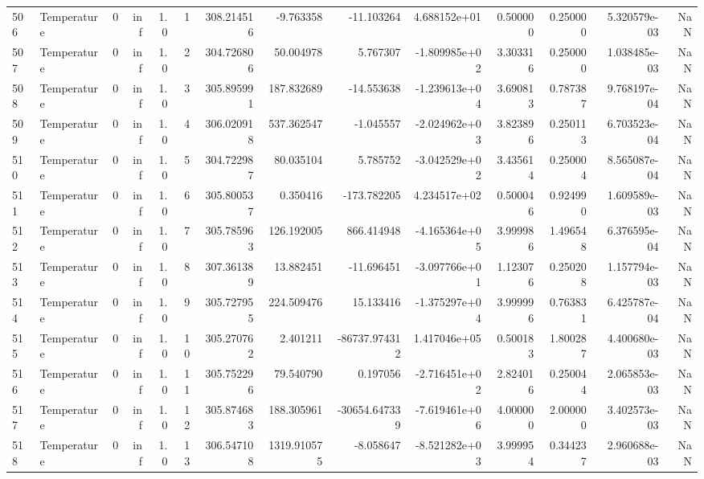 \begin{tabular}{llrrrrrrrrrrrr}
506 &  Temperature &       0 &  inf &  1.0 &    1 &  308.214516 &    -9.763358 &     -11.103264 &  4.688152e+01 &  0.500000 &  0.250000 &  5.320579e-03 &      NaN \\
507 &  Temperature &       0 &  inf &  1.0 &    2 &  304.726806 &    50.004978 &       5.767307 & -1.809985e+02 &  3.303316 &  0.250000 &  1.038485e-03 &      NaN \\
508 &  Temperature &       0 &  inf &  1.0 &    3 &  305.895991 &   187.832689 &     -14.553638 & -1.239613e+04 &  3.690813 &  0.787387 &  9.768197e-04 &      NaN \\
509 &  Temperature &       0 &  inf &  1.0 &    4 &  306.020918 &   537.362547 &      -1.045557 & -2.024962e+03 &  3.823896 &  0.250113 &  6.703523e-04 &      NaN \\
510 &  Temperature &       0 &  inf &  1.0 &    5 &  304.722987 &    80.035104 &       5.785752 & -3.042529e+02 &  3.435614 &  0.250004 &  8.565087e-04 &      NaN \\
511 &  Temperature &       0 &  inf &  1.0 &    6 &  305.800537 &     0.350416 &    -173.782205 &  4.234517e+02 &  0.500046 &  0.924990 &  1.609589e-03 &      NaN \\
512 &  Temperature &       0 &  inf &  1.0 &    7 &  305.785963 &   126.192005 &     866.414948 & -4.165364e+05 &  3.999986 &  1.496548 &  6.376595e-04 &      NaN \\
513 &  Temperature &       0 &  inf &  1.0 &    8 &  307.361389 &    13.882451 &     -11.696451 & -3.097766e+01 &  1.123076 &  0.250208 &  1.157794e-03 &      NaN \\
514 &  Temperature &       0 &  inf &  1.0 &    9 &  305.727955 &   224.509476 &      15.133416 & -1.375297e+04 &  3.999996 &  0.763831 &  6.425787e-04 &      NaN \\
515 &  Temperature &       0 &  inf &  1.0 &   10 &  305.270762 &     2.401211 &  -86737.974312 &  1.417046e+05 &  0.500183 &  1.800287 &  4.400680e-03 &      NaN \\
516 &  Temperature &       0 &  inf &  1.0 &   11 &  305.752296 &    79.540790 &       0.197056 & -2.716451e+02 &  2.824016 &  0.250044 &  2.065853e-03 &      NaN \\
517 &  Temperature &       0 &  inf &  1.0 &   12 &  305.874683 &   188.305961 &  -30654.647339 & -7.619461e+06 &  4.000000 &  2.000000 &  3.402573e-03 &      NaN \\
518 &  Temperature &       0 &  inf &  1.0 &   13 &  306.547108 &  1319.910575 &      -8.058647 & -8.521282e+03 &  3.999954 &  0.344237 &  2.960688e-03 &      NaN \\

\end{tabular}
